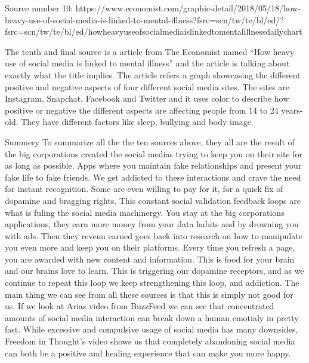 \documentclass[11pt]{article}
\begin{document}
Source number 10:
https://www.economist.com/graphic-detail/2018/05/18/how-heavy-use-of-social-media-is-linked-to-mental-illness?fsrc=scn/tw/te/bl/ed/?fsrc=scn/tw/te/bl/ed/howheavyuseofsocialmediaislinkedtomentalillnessdailychart


The tenth and final source is a article from The Economist named “How heavy use of social media is linked to mental illness” and the article is talking about exactly what the title implies. The article refers a graph showcasing the different positive and negative aspects of four different social media sites. The sites are Instagram, Snapchat, Facebook and Twitter and it uses color to describe how positive or negative the different aspects are affecting people from 14 to 24 years-old. They have different factors like sleep, bullying and body image.


Summery
To summarize all the the ten sources above, they all are the result of the big corporations created the social medias trying to keep you on their site for as long as possible. Apps where you maintain fake relationships and present your fake life to fake friends.  We get addicted to these interactions and crave the need for instant recognition. Some are even willing to pay for it, for a quick fix of dopamine and bragging rights. This constant social validation feedback loops are what is fuling the social media machinergy. You stay at the big corporations applications, they earn more money from your data habits and by drowning you with ads. Then they revenu earned goes back into research on how to manipulate you even more and keep you on their platforms.
Every time you refresh a page, you are awarded with new content and information. This is food for your brain and our brains love to learn. This is triggering our dopamine receptors, and as we continue to repeat this loop we keep strengthening this loop, and addiction.
The main thing we can see from all these sources is that this is simply not good for us. If we look at Arias video from BuzzFeed we can see that concentrated amounts of social media interaction can break down a human emotialy in pretty fast. While excessive and compulsive usage of social media has many downsides, Freedom in Thought’s video shows us that completely abandoning social media can both be a positive and healing experience that can make you more happy.


\pagebreak


\end{document}
